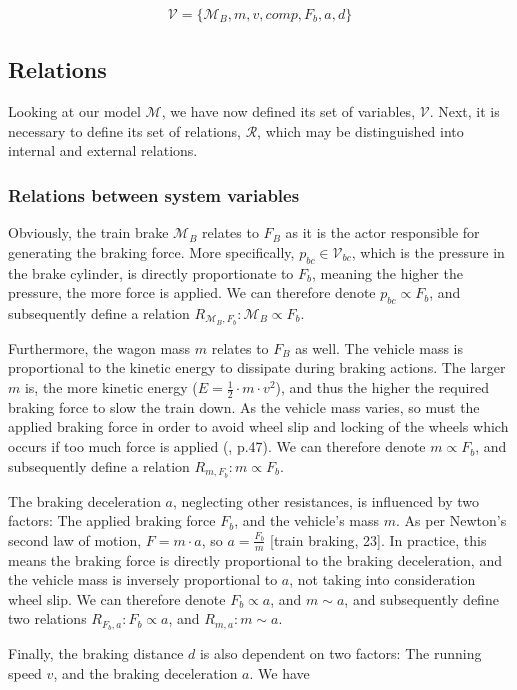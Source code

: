 \begin{align*}
{\mathcal{V}} = \{ {\mathcal{M}}_{B},m,v,comp,F_{b},a,d \}
\end{align*}

\subsection{Relations}
\label{sec:Relations}
\par\noindent
Looking at our model ${\mathcal{M}}$, we have now defined its set of variables, ${\mathcal{V}}$. Next, it is necessary to define its set of relations, ${\mathcal{R}}$, which may be distinguished into internal and external relations.

\subsubsection{Relations between system variables}
\label{sec:RelationsSystemVariables}
\par\noindent
Obviously, the train brake ${\mathcal{M}}_{B}$ relates to $F_{B}$ as it is the actor responsible for generating the braking force. More specifically, $p_{bc} \in {\mathcal{V}}_{bc}$, which is the pressure in the brake cylinder, is directly proportionate to $F_{b}$, meaning the higher the pressure, the more force is applied. We can therefore denote $p_{bc} \propto F_{b}$, and subsequently define a relation $R_{{\mathcal{M}}_{B},F_{b}}: {\mathcal{M}}_{B} \propto F_{b}$.
\par
Furthermore, the wagon mass $m$ relates to $F_{B}$ as well. The vehicle mass is proportional to the kinetic energy to dissipate during braking actions. The larger $m$ is, the more kinetic energy ($E=\frac{1}{2} \cdot m \cdot v^{2}$), and thus the higher the required braking force to slow the train down. As the vehicle mass varies, so must the applied braking force in order to avoid wheel slip and locking of the wheels which occurs if too much force is applied (\cite{Cruceanu2012}, p.47). We can therefore denote $m \propto F_{b}$, and subsequently define a relation $R_{m,F_{b}}: m \propto F_{b}$.
\par
The braking deceleration $a$, neglecting other resistances, is influenced by two factors: The applied braking force $F_{b}$, and the vehicle's mass $m$. As per Newton's second law of motion, $F=m \cdot a$, so $a=\frac{F_{b}}{m}$ [train braking, 23]. In practice, this means the braking force is directly proportional to the braking deceleration, and the vehicle mass is inversely proportional to $a$, not taking into consideration wheel slip. We can therefore denote $F_{b} \propto a$, and $m \sim a$, and subsequently define two relations $R_{F_{b},a}: F_{b} \propto a$, and $R_{m,a}: m \sim a$.
\par
Finally, the braking distance $d$ is also dependent on two factors: The running speed $v$, and the braking deceleration $a$.  We have 

